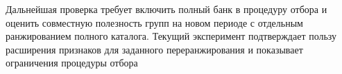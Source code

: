 Дальнейшая проверка требует включить полный банк в процедуру отбора
и оценить совместную полезность групп на новом периоде
с отдельным ранжированием полного каталога.
Текущий эксперимент подтверждает пользу расширения признаков
для заданного переранжирования и показывает ограничения процедуры отбора
